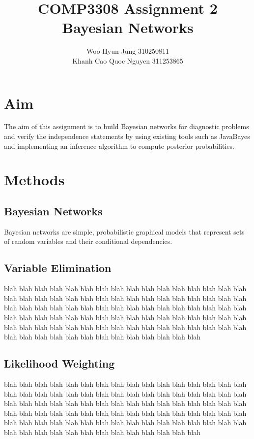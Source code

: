 \documentclass{article}
\title{COMP3308 Assignment 2 \\ Bayesian Networks}
\author{Woo Hyun Jung 310250811 \\  Khanh Cao Quoc Nguyen 311253865}
\date{}
\begin{document}
\maketitle
\thispagestyle{empty}
\newpage

\section{Aim}
The aim of this assignment is to build Bayesian networks for diagnostic problems and verify the independence statements by using existing tools such as JavaBayes and implementing an inference algorithm to compute posterior probabilities.

\section{Methods}
\subsection{Bayesian Networks}
Bayesian networks are simple, probabilistic graphical models that represent sets of random variables and their conditional dependencies.

\subsection{Variable Elimination}
blah blah blah blah blah blah blah blah blah blah blah blah blah blah blah blah blah blah blah blah blah blah blah blah blah blah blah blah blah blah blah blah blah blah blah blah blah blah blah blah blah blah blah blah blah blah blah blah blah blah blah blah blah blah blah blah blah blah blah blah blah blah blah blah blah blah blah blah blah blah blah blah blah blah blah blah blah blah blah blah blah blah blah blah blah blah blah blah blah blah blah blah blah 

\subsection{Likelihood Weighting}
blah blah blah blah blah blah blah blah blah blah blah blah blah blah blah blah blah blah blah blah blah blah blah blah blah blah blah blah blah blah blah blah blah blah blah blah blah blah blah blah blah blah blah blah blah blah blah blah blah blah blah blah blah blah blah blah blah blah blah blah blah blah blah blah blah blah blah blah blah blah blah blah blah blah blah blah blah blah blah blah blah blah blah blah blah blah blah blah blah blah blah blah blah 
\end{document}

